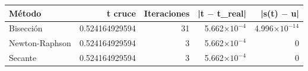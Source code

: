 {\footnotesize
\begin{longtable}{lrrrr}
\toprule
\textbf{Método} & \textbf{t cruce} & \textbf{Iteraciones} & \textbf{|t $-$ t\_real|} & \textbf{|s(t) $-$ u|} \\
\midrule
\endhead
Bisección & 0.524164929594 & 31 & 5.662$\times10^{-4}$ & 4.996$\times10^{-14}$ \\
Newton-Raphson & 0.524164929594 & 3 & 5.662$\times10^{-4}$ & 0 \\
Secante & 0.524164929594 & 3 & 5.662$\times10^{-4}$ & 0 \\
\bottomrule
\end{longtable}
}
